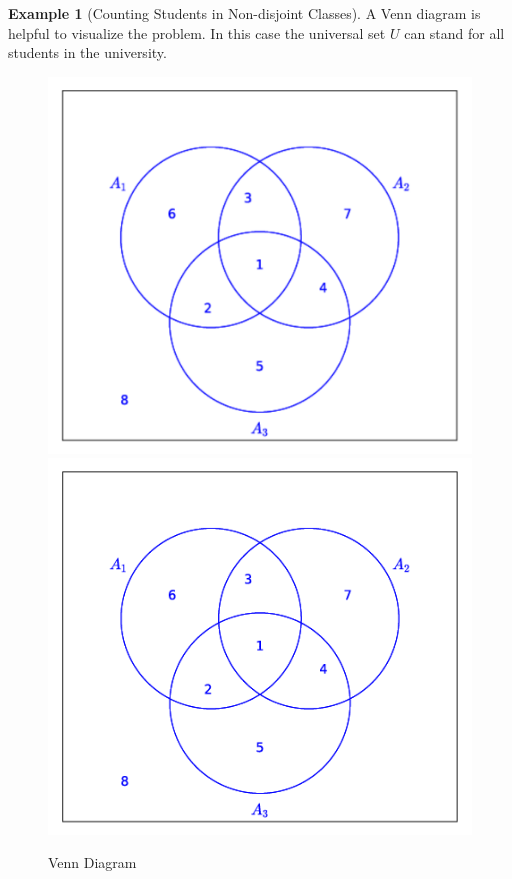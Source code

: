 \documentclass[10pt,]{book}
\theoremstyle{plain}
\theoremstyle{definition}
\theoremstyle{definition}
\newtheorem{example}[theorem]{Example}
\theoremstyle{definition}
\begin{document}
\begin{example}[Counting Students in Non-disjoint Classes]
 A Venn diagram is helpful to visualize the problem. In this case the universal set \(U\)  can stand for 	all students in the university.
%
\leavevmode%
\begin{figure}
\centering
{}%
{\includegraphics[width=1\linewidth]{images/sageplot-venn-CS_Students.pdf}}%
{\includegraphics[width=1\linewidth]{images/sageplot-venn-CS_Students.png}}
\caption{Venn Diagram\label{venn_diagram_CS_Students}}
\end{figure}
\par


\end{example}
\end{document}
